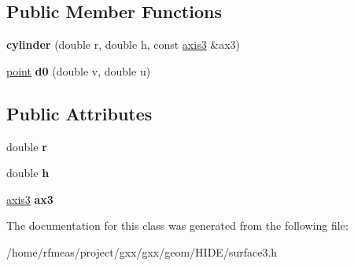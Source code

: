 \subsection*{Public Member Functions}
\begin{DoxyCompactItemize}
\item 
{\bfseries cylinder} (double r, double h, const \hyperlink{classgxx_1_1geom3_1_1axis3}{axis3} \&ax3)\hypertarget{classgxx_1_1surf3_1_1cylinder_a02c9f02f2d8be5aa7f3ca76253ca56a4}{}\label{classgxx_1_1surf3_1_1cylinder_a02c9f02f2d8be5aa7f3ca76253ca56a4}

\item 
\hyperlink{classgxx_1_1geom3_1_1point}{point} {\bfseries d0} (double v, double u)\hypertarget{classgxx_1_1surf3_1_1cylinder_a13d335090c4f2b1ef2d9d60211c0cf18}{}\label{classgxx_1_1surf3_1_1cylinder_a13d335090c4f2b1ef2d9d60211c0cf18}

\end{DoxyCompactItemize}
\subsection*{Public Attributes}
\begin{DoxyCompactItemize}
\item 
double {\bfseries r}\hypertarget{classgxx_1_1surf3_1_1cylinder_a40aebd97a8cb51a8c50a02af2efeeb86}{}\label{classgxx_1_1surf3_1_1cylinder_a40aebd97a8cb51a8c50a02af2efeeb86}

\item 
double {\bfseries h}\hypertarget{classgxx_1_1surf3_1_1cylinder_a6677c0364f298c08e540a58271bc2e85}{}\label{classgxx_1_1surf3_1_1cylinder_a6677c0364f298c08e540a58271bc2e85}

\item 
\hyperlink{classgxx_1_1geom3_1_1axis3}{axis3} {\bfseries ax3}\hypertarget{classgxx_1_1surf3_1_1cylinder_a92862bc9927fdfe31d3b315c9f89d66a}{}\label{classgxx_1_1surf3_1_1cylinder_a92862bc9927fdfe31d3b315c9f89d66a}

\end{DoxyCompactItemize}


The documentation for this class was generated from the following file\+:\begin{DoxyCompactItemize}
\item 
/home/rfmeas/project/gxx/gxx/geom/\+H\+I\+D\+E/surface3.\+h\end{DoxyCompactItemize}
